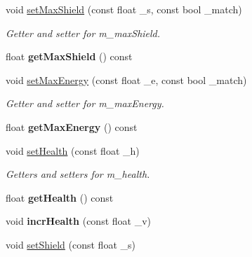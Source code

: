 \begin{DoxyCompactItemize}
\item 
\hypertarget{classship_af0c7edd4a30c5e270f5b57e222c316a1}{void \hyperlink{classship_af0c7edd4a30c5e270f5b57e222c316a1}{set\-Max\-Shield} (const float \-\_\-s, const bool \-\_\-match)}\label{classship_af0c7edd4a30c5e270f5b57e222c316a1}

\begin{DoxyCompactList}\small\item\em Getter and setter for m\-\_\-max\-Shield. \end{DoxyCompactList}\item 
\hypertarget{classship_ad469c878cc8090c424c89cbf3a96a063}{float {\bfseries get\-Max\-Shield} () const }\label{classship_ad469c878cc8090c424c89cbf3a96a063}

\item 
\hypertarget{classship_a634e621176733941096c05dfcf3bff83}{void \hyperlink{classship_a634e621176733941096c05dfcf3bff83}{set\-Max\-Energy} (const float \-\_\-e, const bool \-\_\-match)}\label{classship_a634e621176733941096c05dfcf3bff83}

\begin{DoxyCompactList}\small\item\em Getter and setter for m\-\_\-max\-Energy. \end{DoxyCompactList}\item 
\hypertarget{classship_a954fe1bf94be13826196c169250bd964}{float {\bfseries get\-Max\-Energy} () const }\label{classship_a954fe1bf94be13826196c169250bd964}

\item 
\hypertarget{classship_a211c3f3057bfa0edba1b308395fae839}{void \hyperlink{classship_a211c3f3057bfa0edba1b308395fae839}{set\-Health} (const float \-\_\-h)}\label{classship_a211c3f3057bfa0edba1b308395fae839}

\begin{DoxyCompactList}\small\item\em Getters and setters for m\-\_\-health. \end{DoxyCompactList}\item 
\hypertarget{classship_a62f52e8063ad01583c7b9fc3e5c2aca3}{float {\bfseries get\-Health} () const }\label{classship_a62f52e8063ad01583c7b9fc3e5c2aca3}

\item 
\hypertarget{classship_a879475726ca8825f5256d9bf77383da4}{void {\bfseries incr\-Health} (const float \-\_\-v)}\label{classship_a879475726ca8825f5256d9bf77383da4}

\item 
\hypertarget{classship_a96e9f6e8fae43c1fa8a03d490491b96c}{void \hyperlink{classship_a96e9f6e8fae43c1fa8a03d490491b96c}{set\-Shield} (const float \-\_\-s)}\label{classship_a96e9f6e8fae43c1fa8a03d490491b96c}


\end{DoxyCompactItemize}
